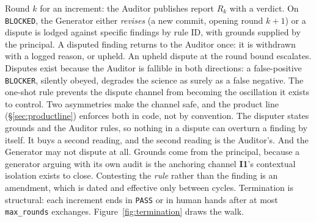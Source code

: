 \documentclass[11pt,letterpaper]{article}
\newcommand{\invariant}[1]{\textbf{I#1}}
\begin{document}
Round $k$ for an increment: the Auditor publishes report $R_k$ with a verdict. On \texttt{BLOCKED}, the Generator either \emph{revises} (a new commit, opening round $k{+}1$) or a dispute is lodged against specific findings by rule ID, with grounds supplied by the principal. A disputed finding returns to the Auditor once: it is withdrawn with a logged reason, or upheld. An upheld dispute at the round bound escalates. Disputes exist because the Auditor is fallible in both directions: a false-positive \texttt{BLOCKER}, silently obeyed, degrades the science as surely as a false negative. The one-shot rule prevents the dispute channel from becoming the oscillation it exists to control. Two asymmetries make the channel safe, and the product line (\S\ref{sec:productline}) enforces both in code, not by convention. The disputer states grounds and the Auditor rules, so nothing in a dispute can overturn a finding by itself. It buys a second reading, and the second reading is the Auditor's. And the Generator may not dispute at all. Grounds come from the principal, because a generator arguing with its own audit is the anchoring channel \invariant{1}'s contextual isolation exists to close. Contesting the \emph{rule} rather than the finding is an amendment, which is dated and effective only between cycles. Termination is structural: each increment ends in \texttt{PASS} or in human hands after at most \texttt{max\_rounds} exchanges. Figure~\ref{fig:termination} draws the walk.
\end{document}
